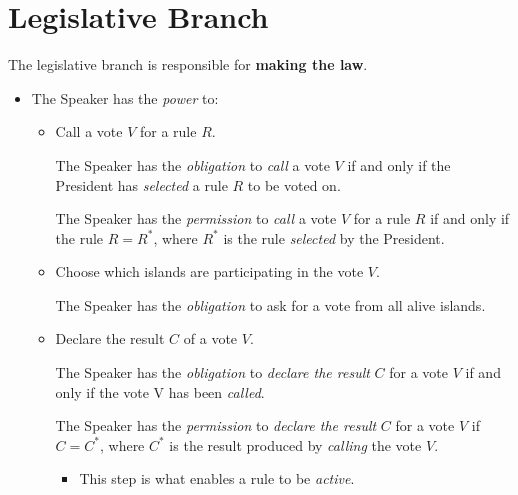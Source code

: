 \section{Legislative Branch}
\label{sec:legislative}
The legislative branch is responsible for \textbf{making the law}.
\begin{itemize}

    \item The Speaker has the \emph{power} to:
    \begin{itemize}

        \item Call a vote $V$ for a rule $R$.
        \begin{rule_IIGO}
            The Speaker has the \emph{obligation} to \emph{call} a vote $V$ if and only if the President has \emph{selected} a rule $R$ to be voted on.
        \end {rule_IIGO}
        \begin{rule_IIGO}
            The Speaker has the \emph{permission} to \emph{call} a vote $V$ for a rule $R$ if and only if the rule $R = R^{*}$, where $R^{*}$ is the rule \emph{selected} by the President.
        \end {rule_IIGO}

        \item Choose which islands are participating in the vote $V$.
        \begin{rule_IIGO}
            The Speaker has the \emph{obligation} to ask for a vote from all alive islands.
        \end {rule_IIGO}

        \item Declare the result $C$ of a vote $V$.
        \begin{rule_IIGO}
            The Speaker has the \emph{obligation} to \emph{declare the result} $C$ for a vote $V$ if and only if the vote V has been \emph{called}.
        \end {rule_IIGO}
        \begin{rule_IIGO}
            The Speaker has the \emph{permission} to \emph{declare the result} $C$ for a vote $V$ if $C = C^{*}$, where $C^{*}$ is the result produced by \emph{calling} the vote $V$.
        \end {rule_IIGO}
        \begin{itemize}
            \item This step is what enables a rule to be \emph{active}.
        \end{itemize}
    \end{itemize}
\end{itemize}




